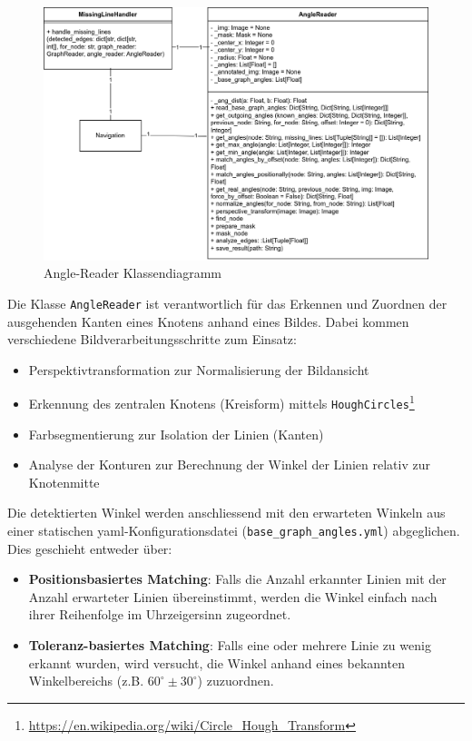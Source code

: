 \begin{figure}[H]
    \centering
    \includegraphics[width=1\linewidth]{assets/IT/robot-sw-architecture-node_reader_angles.png}
    \caption{Angle-Reader Klassendiagramm}
    \label{fig:angle-reader-classdiagramm}
\end{figure}

Die Klasse \verb|AngleReader| ist verantwortlich für das Erkennen und Zuordnen der ausgehenden Kanten eines Knotens anhand eines Bildes. Dabei kommen verschiedene Bildverarbeitungsschritte zum Einsatz: 
\begin{itemize}
    \item Perspektivtransformation zur Normalisierung der Bildansicht
    \item Erkennung des zentralen Knotens (Kreisform) mittels \verb|HoughCircles|\footnote{\url{https://en.wikipedia.org/wiki/Circle_Hough_Transform}}
    \item Farbsegmentierung zur Isolation der Linien (Kanten)
    \item Analyse der Konturen zur Berechnung der Winkel der Linien relativ zur Knotenmitte
\end{itemize}

Die detektierten Winkel werden anschliessend mit den erwarteten Winkeln aus einer statischen \gls{yaml}-Konfigurationsdatei (\verb|base_graph_angles.yml|) abgeglichen. Dies geschieht entweder über:

\begin{itemize}
    \item \textbf{Positionsbasiertes Matching}: Falls die Anzahl erkannter Linien mit der Anzahl erwarteter Linien übereinstimmt, werden die Winkel einfach nach ihrer Reihenfolge im Uhrzeigersinn zugeordnet.
    \item \textbf{Toleranz-basiertes Matching}: Falls eine oder mehrere Linie zu wenig erkannt wurden, wird versucht, die Winkel anhand eines bekannten Winkelbereichs (z.B. $60^\circ \pm 30^\circ$) zuzuordnen.
\end{itemize}

